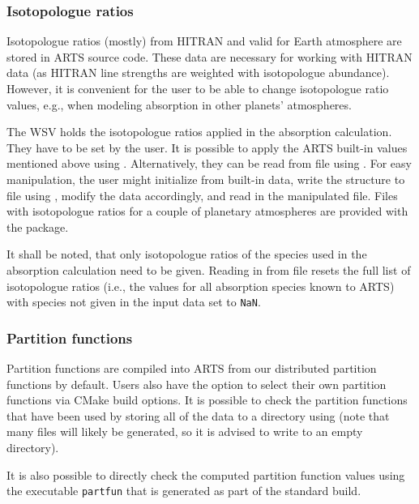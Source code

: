 \subsubsection{Isotopologue ratios}
\label{sec:absorption:isoratio}

Isotopologue ratios (mostly) from HITRAN and valid for Earth atmosphere are
stored in ARTS source code. These data are necessary for working with HITRAN data
(as HITRAN line strengths are weighted with isotopologue abundance). However,
it is convenient for the user to be able to change isotopologue ratio values,
e.g., when modeling absorption in other planets' atmospheres.

The WSV  holds the isotopologue ratios applied in
the absorption calculation. They have to be set by the user. It is possible to
apply the ARTS built-in values mentioned above using
. Alternatively, they can be read
from file using . For easy manipulation, the user might
initialize  from built-in data, write the
 structure to file using ,
modify the data accordingly, and read in the manipulated file.
Files with isotopologue ratios for a couple of planetary atmospheres are
provided with the  package.

It shall be noted, that only isotopologue ratios of the species used in the
absorption calculation need to be given. Reading in from file resets the full
list of isotopologue ratios (i.e., the values for all absorption species known to
ARTS) with species not given in the input data set to \verb|NaN|.

\subsubsection{Partition functions}
\label{sec:absorption:partition}

Partition functions are compiled into ARTS from our distributed partition functions
by default.  Users also have the option to select their own partition functions via
CMake build options.  It is possible to check the partition functions that have been
used by storing all of the data to a directory using 
(note that many files will likely be generated, so it is advised to write to an empty directory).

It is also possible to directly check the computed partition function values using the
executable \verb|partfun| that is generated as part of the standard build.

